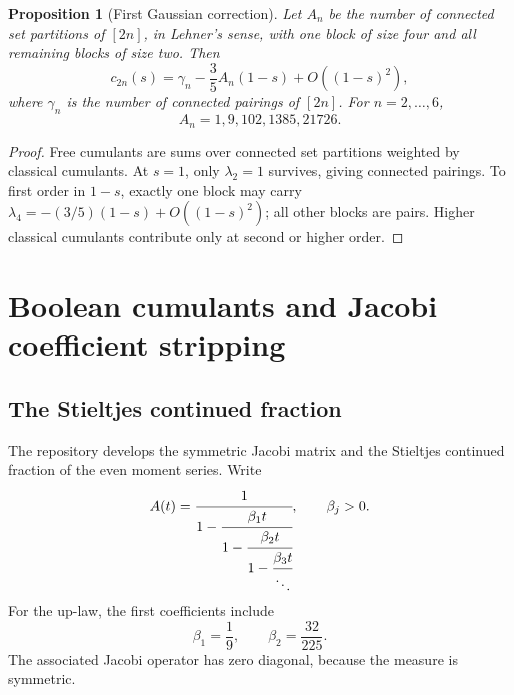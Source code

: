 \documentclass[11pt]{article}
\newtheorem{proposition}[theorem]{Proposition}
\theoremstyle{definition}
\begin{document}
\begin{proposition}[First Gaussian correction]\label{prop:connectedcorrection}
Let \(A_n\) be the number of connected set partitions of \([2n]\), in Lehner's sense, with one block of size four and all remaining blocks of size two. Then
\begin{equation}\label{eq:connectedcorrection}
c_{2n}(s)=\gamma_n-\frac35A_n(1-s)+O((1-s)^2),
\end{equation}
where \(\gamma_n\) is the number of connected pairings of \([2n]\). For \(n=2,\ldots,6\),
\[
A_n=1,9,102,1385,21726.
\]
\end{proposition}
\begin{proof}
Free cumulants are sums over connected set partitions weighted by classical cumulants. At \(s=1\), only \(\lambda_2=1\) survives, giving connected pairings. To first order in \(1-s\), exactly one block may carry \(\lambda_4=-(3/5)(1-s)+O((1-s)^2)\); all other blocks are pairs. Higher classical cumulants contribute only at second or higher order.
\end{proof}

\section{Boolean cumulants and Jacobi coefficient stripping}
\subsection{The Stieltjes continued fraction}
The repository develops the symmetric Jacobi matrix and the Stieltjes continued fraction of the even moment series. Write
\begin{equation}\label{eq:Sfraction}
A(t)=
\cfrac{1}{1-\cfrac{\beta_1t}{1-\cfrac{\beta_2t}{1-\cfrac{\beta_3t}{\ddots}}}},
\qquad \beta_j>0.
\end{equation}
For the up-law, the first coefficients include
\begin{equation}\label{eq:firstbetas}
\beta_1=\frac19,
\qquad
\beta_2=\frac{32}{225}.
\end{equation}
The associated Jacobi operator has zero diagonal, because the measure is symmetric.
\end{document}
